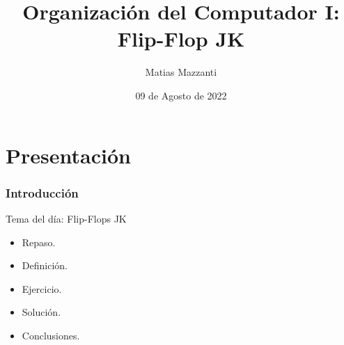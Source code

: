 \documentclass[10pt]{beamer}
\title[Flip-Flop JK]{Organizaci\'on del Computador I: Flip-Flop JK}
\author[Matias Mazzanti]{Matias Mazzanti}
\institute{DC-UBA}
\date{09 de Agosto de 2022}
\begin{document}
\begin{frame}

\maketitle

\end{frame}


\section{Presentaci\'on}
\begin{frame}
\frametitle{Introducción}
\begin{mdframed}[backgroundcolor=frenchblue!20]
  Tema del día: Flip-Flops JK
\end{mdframed}
\pause

\begin{itemize}
  \item Repaso.
  \item Definición.
  \item Ejercicio.
  \item Solución.
  \item Conclusiones.
\end{itemize}

\end{frame}
\end{document}
